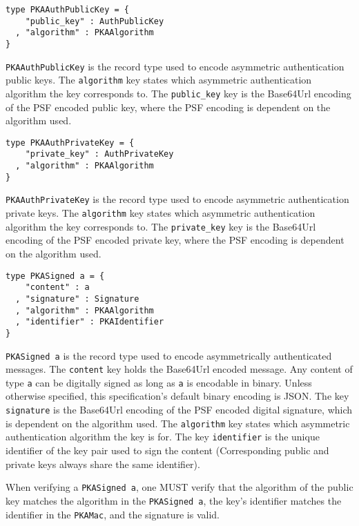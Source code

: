 \documentclass{article}
\begin{document}
\begin{lstlisting}
type PKAAuthPublicKey = {
    "public_key" : AuthPublicKey
  , "algorithm" : PKAAlgorithm
}
\end{lstlisting}

\texttt{PKAAuthPublicKey} is the record type used to encode asymmetric authentication public keys. 
The \texttt{algorithm} key states which asymmetric authentication algorithm the key corresponds to. 
The \texttt{public\_key} key is the Base64Url encoding of the PSF encoded public key, where the PSF encoding is dependent on the algorithm used. 

\begin{lstlisting}
type PKAAuthPrivateKey = {
    "private_key" : AuthPrivateKey
  , "algorithm" : PKAAlgorithm
}
\end{lstlisting}

\texttt{PKAAuthPrivateKey} is the record type used to encode asymmetric authentication private keys. 
The \texttt{algorithm} key states which asymmetric authentication algorithm the key corresponds to. 
The \texttt{private\_key} key is the Base64Url encoding of the PSF encoded private key, where the PSF encoding is dependent on the algorithm used. 

\begin{lstlisting}
type PKASigned a = {
    "content" : a
  , "signature" : Signature
  , "algorithm" : PKAAlgorithm
  , "identifier" : PKAIdentifier
}
\end{lstlisting}

\texttt{PKASigned a} is the record type used to encode asymmetrically authenticated messages. 
The \texttt{content} key holds the Base64Url encoded message. 
Any content of type \texttt{a} can be digitally signed as long as \texttt{a} is encodable in binary. 
Unless otherwise specified, this specification's default binary encoding is JSON. 
The key \texttt{signature} is the Base64Url encoding of the PSF encoded digital signature, which is dependent on the algorithm used.  
The \texttt{algorithm} key states which asymmetric authentication algorithm the key is for. 
The key \texttt{identifier} is the unique identifier of the key pair used to sign the content (Corresponding public and private keys always share the same identifier). 

When verifying a \texttt{PKASigned a},  one MUST verify that the algorithm of the public key matches the algorithm in the \texttt{PKASigned a}, the key's identifier matches the identifier in the \texttt{PKAMac}, and the signature is valid. 
\end{document}
